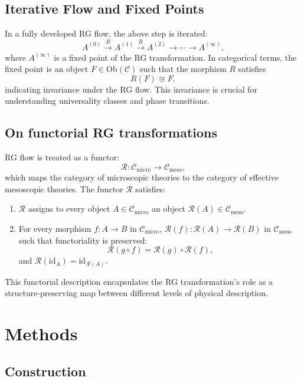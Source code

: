 \subsection{Iterative Flow and Fixed Points}

In a fully developed RG flow, the above step is iterated:
\[
A^{(0)} \xrightarrow{R} A^{(1)} \xrightarrow{R} A^{(2)} \to \cdots \to A^{(\infty)},
\]
where \(A^{(\infty)}\) is a fixed point of the RG transformation. In categorical terms, the fixed point is an object \(F \in \mathrm{Ob}(\mathcal{C})\) such that the morphism \(R\) satisfies
\[
R(F) \cong F,
\]
indicating invariance under the RG flow. This invariance is crucial for understanding universality classes and phase transitions.

\subsection{On functorial RG transformations}

RG flow is treated as a functor:
\[
\mathcal{R}: \mathcal{C}_{\text{micro}} \to \mathcal{C}_{\text{meso}},
\]
which maps the category of microscopic theories to the category of effective mesoscopic theories. The functor \(\mathcal{R}\) satisfies:
\begin{enumerate}[label=(\alph*)]
	\item \(\mathcal{R}\) assigns to every object \(A \in \mathcal{C}_{\text{micro}}\) an object \(\mathcal{R}(A) \in \mathcal{C}_{\text{meso}}\).
	\item For every morphism \(f: A \to B\) in \(\mathcal{C}_{\text{micro}}\), \(\mathcal{R}(f): \mathcal{R}(A) \to \mathcal{R}(B)\) in \(\mathcal{C}_{\text{meso}}\) such that functoriality is preserved:
	\[
	\mathcal{R}(g \circ f) = \mathcal{R}(g) \circ \mathcal{R}(f),
	\]
	and \(\mathcal{R}(\mathrm{id}_A) = \mathrm{id}_{\mathcal{R}(A)}\).
\end{enumerate}
This functorial description encapsulates the RG transformation's role as a structure-preserving map between different levels of physical description.


\pagebreak

\section{Methods}
\subsection{Construction}


